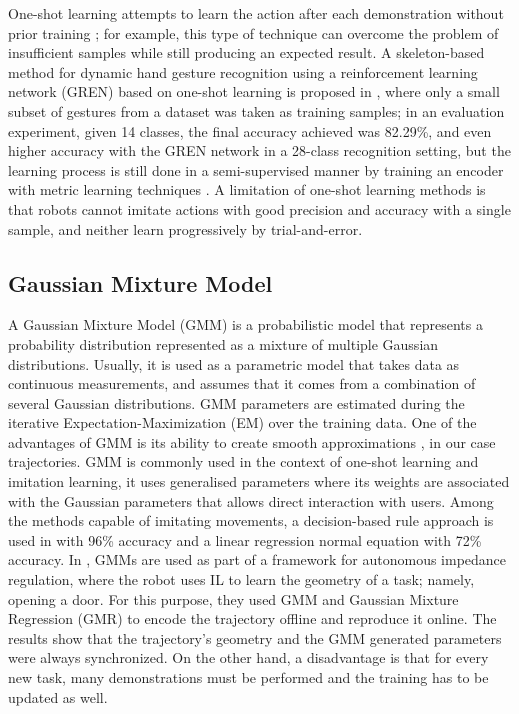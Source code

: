 \documentclass[thesis]{mas_proposal}
\begin{document}
    One-shot learning attempts to learn the action after each demonstration without prior training \cite{Yan2010}; for example, this type of technique can overcome the problem of insufficient samples while still producing an expected result. A skeleton-based method for dynamic hand gesture recognition using a reinforcement learning network (GREN) based on one-shot learning is proposed in \cite{Chunyong2020}, where only a small subset of gestures from a dataset was taken as training samples; in an evaluation experiment, given 14 classes, the final accuracy achieved was 82.29\%, and even higher accuracy with the GREN network in a 28-class recognition setting, but the learning process is still done in a semi-supervised manner by training an encoder with metric learning techniques \cite{Sabater2021}. A limitation of one-shot learning methods is that robots cannot imitate actions with good precision and accuracy with a single sample, and neither learn progressively by trial-and-error.
    
    \subsection{Gaussian Mixture Model}
    
    A Gaussian Mixture Model (GMM) is a probabilistic model that represents a probability distribution represented as a mixture of multiple Gaussian distributions. Usually, it is used as a parametric model that takes data as continuous measurements, and assumes that it comes from a combination of several Gaussian distributions. GMM parameters are estimated during the iterative Expectation-Maximization (EM) over the training data. One of the advantages of GMM is its ability to create smooth approximations \cite{Reynolds2009}, in our case trajectories. GMM is commonly used in the context of one-shot learning and imitation learning, it uses generalised parameters where its weights are associated with the Gaussian parameters that allows direct interaction with users. Among the methods capable of imitating movements, a decision-based rule approach is used in \cite{Itauma2012} with 96\% accuracy and a linear regression normal equation with 72\% accuracy. In \cite{Wu2020}, GMMs are used as part of a framework for autonomous impedance regulation, where the robot uses IL to learn the geometry of a task; namely, opening a door. For this purpose, they used GMM and Gaussian Mixture Regression (GMR) to encode the trajectory offline and reproduce it online. The results show that the trajectory's geometry and the GMM generated parameters were always synchronized. On the other hand, a disadvantage is that for every new task, many demonstrations must be performed and the training has to be updated as well.
    
\end{document}

